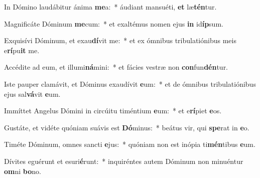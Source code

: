 \item In Dómino laudábitur ánima \textbf{me}a:~* áudiant mansuéti, \textbf{et} læ\textbf{tén}tur.
\item Magnificáte Dóminum \textbf{me}cum:~* et exaltémus nomen ejus \textbf{in} id\textbf{íp}sum.
\item Exquisívi Dóminum, et exau\textbf{dí}vit me:~* et ex ómnibus tribulatiónibus meis e\textbf{rí}pu\textbf{it} me.
\item Accédite ad eum, et illumi\textbf{ná}mini:~* et fácies vestræ non \textbf{con}fun\textbf{dén}tur.
\item Iste pauper clamávit, et Dóminus exaudívit \textbf{e}um:~* et de ómnibus tribulatiónibus ejus sal\textbf{vá}vit \textbf{e}um.
\item Immíttet Angelus Dómini in circúitu timéntium \textbf{e}um:~* et e\textbf{rí}piet \textbf{e}os.
\item Gustáte, et vidéte quóniam suávis est \textbf{Dó}minus:~* beátus vir, qui \textbf{spe}rat in \textbf{e}o.
\item Timéte Dóminum, omnes sancti \textbf{e}jus:~* quóniam non est inópia ti\textbf{mén}tibus \textbf{e}um.
\item Dívites eguérunt et esuri\textbf{é}runt:~* inquiréntes autem Dóminum non minuéntur \textbf{om}ni \textbf{bo}no.
